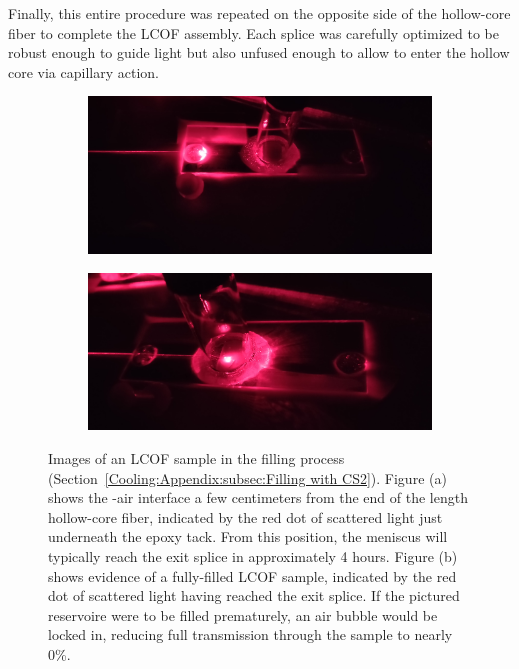 Finally, this entire procedure was repeated on the opposite side of the hollow-core fiber to complete the \ac{LCOF} assembly. Each splice was carefully optimized to be robust enough to guide light but also unfused enough to allow  to enter the hollow core via capillary action.

\begin{figure}[t]
    \centering
    \begin{subfigure}[b]{0.49\textwidth}
        \centering
        \includegraphics[width=\textwidth]{figs/3-Cooling/CS2NearlyReached.jpg}
        \caption{}
        \label{fig:Cooling:CS2 Nearly Reached}
    \end{subfigure}
    \hfill
    \begin{subfigure}[b]{0.49\textwidth}
        \centering
        \includegraphics[width=\textwidth]{figs/3-Cooling/CS2Reached.jpg}
        \caption{}
        \label{fig:Cooling:CS2 Reached}
    \end{subfigure}
    \caption{Images of an \ac{LCOF} sample in the filling process (Section~\ref{Cooling:Appendix:subsec:Filling with CS2}). Figure (a) shows the -air interface a few centimeters from the end of the length hollow-core fiber, indicated by the red dot of scattered light just underneath the epoxy tack. From this position, the meniscus will typically reach the exit splice in approximately 4 hours. Figure (b) shows evidence of a fully-filled \ac{LCOF} sample, indicated by the red dot of scattered light having reached the exit splice. If the pictured reservoire were to be filled prematurely, an air bubble would be locked in, reducing full transmission through the sample to nearly 0\%.}
    \label{fig:Cooling:red dot monitoring near the end}
\end{figure}

